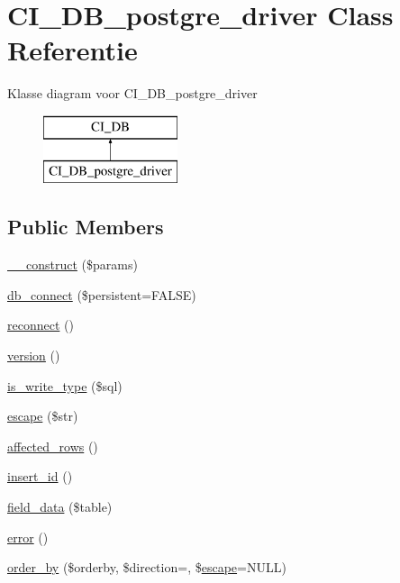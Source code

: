 \hypertarget{class_c_i___d_b__postgre__driver}{}\section{C\+I\+\_\+\+D\+B\+\_\+postgre\+\_\+driver Class Referentie}
\label{class_c_i___d_b__postgre__driver}
Klasse diagram voor C\+I\+\_\+\+D\+B\+\_\+postgre\+\_\+driver\begin{figure}[H]
\begin{center}
\leavevmode
\includegraphics[height=2.000000cm]{class_c_i___d_b__postgre__driver}
\end{center}
\end{figure}
\subsection*{Public Members}
\begin{DoxyCompactItemize}
\item 
\mbox{\hyperlink{class_c_i___d_b__postgre__driver_a9162320adff1a1a4afd7f2372f753a3e}{\+\_\+\+\_\+construct}} (\$params)
\item 
\mbox{\hyperlink{class_c_i___d_b__postgre__driver_a52bf595e79e96cc0a7c907a9b45aeb4d}{db\+\_\+connect}} (\$persistent=F\+A\+L\+SE)
\item 
\mbox{\hyperlink{class_c_i___d_b__postgre__driver_a57c19c642ab3023e28d10c50f86ff0a8}{reconnect}} ()
\item 
\mbox{\hyperlink{class_c_i___d_b__postgre__driver_a6080dae0886626b9a4cedb29240708b1}{version}} ()
\item 
\mbox{\hyperlink{class_c_i___d_b__postgre__driver_af435df5703c238769d6d16fde6d51182}{is\+\_\+write\+\_\+type}} (\$sql)
\item 
\mbox{\hyperlink{class_c_i___d_b__postgre__driver_ac8f37ca5703d4558c732e692194f8cd6}{escape}} (\$str)
\item 
\mbox{\hyperlink{class_c_i___d_b__postgre__driver_a77248aaad33eb132c04cc4aa3f4bc8cb}{affected\+\_\+rows}} ()
\item 
\mbox{\hyperlink{class_c_i___d_b__postgre__driver_a933f2cde8dc7f87875e257d0a4902e99}{insert\+\_\+id}} ()
\item 
\mbox{\hyperlink{class_c_i___d_b__postgre__driver_a90355121e1ed009e0efdbd544ab56efa}{field\+\_\+data}} (\$table)
\item 
\mbox{\hyperlink{class_c_i___d_b__postgre__driver_a43b8d30b879d4f09ceb059b02af2bc02}{error}} ()
\item 
\mbox{\hyperlink{class_c_i___d_b__postgre__driver_a6d1ce6a3b22187165ce7d710ce91841d}{order\+\_\+by}} (\$orderby, \$direction=\textquotesingle{}\textquotesingle{}, \$\mbox{\hyperlink{class_c_i___d_b__postgre__driver_ac8f37ca5703d4558c732e692194f8cd6}{escape}}=N\+U\+LL)
\end{DoxyCompactItemize}
